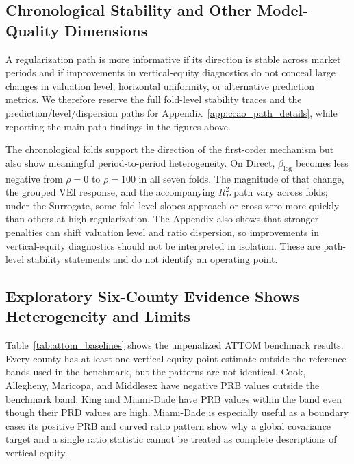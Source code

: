 \documentclass[10pt]{article}
\theoremstyle{definition}
\newcommand{\1}{\mathbf{1}}
\begin{document}
\subsection{Chronological Stability and Other Model-Quality Dimensions}
\label{subsec:path_stability_results}

A regularization path is more informative if its direction is stable across market
periods and if improvements in vertical-equity diagnostics do not conceal large
changes in valuation level, horizontal uniformity, or alternative prediction
metrics. We therefore reserve the full fold-level stability traces and the
prediction/level/dispersion paths for Appendix~\ref{app:ccao_path_details}, while
reporting the main path findings in the figures above.

The chronological folds support the direction of the first-order mechanism but also
show meaningful period-to-period heterogeneity. On Direct, $\beta_{\log}$ becomes
less negative from $\rho=0$ to $\rho=100$ in all seven folds. The magnitude of
that change, the grouped VEI response, and the accompanying $R^2_P$ path vary
across folds; under the Surrogate, some fold-level slopes approach or cross zero
more quickly than others at high regularization. The Appendix also shows that
stronger penalties can shift valuation level and ratio dispersion, so improvements
in vertical-equity diagnostics should not be interpreted in isolation. These are
path-level stability statements and do not identify an operating point.

\subsection{Exploratory Six-County Evidence Shows Heterogeneity and Limits}
\label{subsec:attom_results}

Table~\ref{tab:attom_baselines} shows the unpenalized ATTOM benchmark results. Every county has at least one vertical-equity point estimate outside the reference bands used in the benchmark, but the patterns are not identical. Cook, Allegheny, Maricopa, and Middlesex have negative PRB values outside the benchmark band. King and Miami-Dade have PRB values within the band even though their PRD values are high. Miami-Dade is especially useful as a boundary case: its positive PRB and curved ratio pattern show why a global covariance target and a single ratio statistic cannot be treated as complete descriptions of vertical equity.
\end{document}
